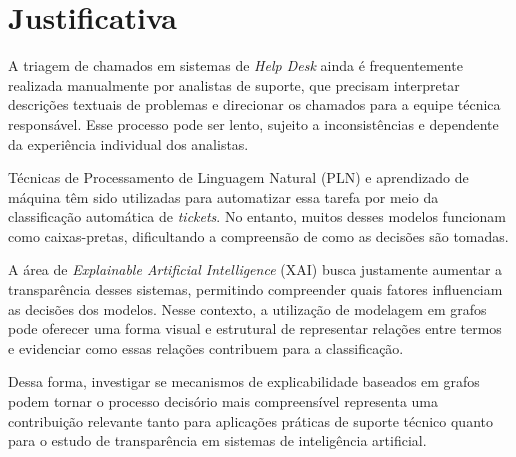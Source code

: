 \documentclass[
    12pt,                %
    openright,           %
    oneside,             %
    a4paper,             %
    english,             %
    brazil               %
]{abntex2}
\begin{document}



\section{Justificativa}
\label{sec:justificativa}

A triagem de chamados em sistemas de \textit{Help Desk} ainda é frequentemente realizada manualmente por analistas de suporte, que precisam interpretar descrições textuais de problemas e direcionar os chamados para a equipe técnica responsável. Esse processo pode ser lento, sujeito a inconsistências e dependente da experiência individual dos analistas.

Técnicas de Processamento de Linguagem Natural (PLN) e aprendizado de máquina têm sido utilizadas para automatizar essa tarefa por meio da classificação automática de \textit{tickets}. No entanto, muitos desses modelos funcionam como caixas-pretas, dificultando a compreensão de como as decisões são tomadas.

A área de \textit{Explainable Artificial Intelligence} (XAI) busca justamente aumentar a transparência desses sistemas, permitindo compreender quais fatores influenciam as decisões dos modelos. Nesse contexto, a utilização de modelagem em grafos pode oferecer uma forma visual e estrutural de representar relações entre termos e evidenciar como essas relações contribuem para a classificação.

Dessa forma, investigar se mecanismos de explicabilidade baseados em grafos podem tornar o processo decisório mais compreensível representa uma contribuição relevante tanto para aplicações práticas de suporte técnico quanto para o estudo de transparência em sistemas de inteligência artificial.
\end{document}
